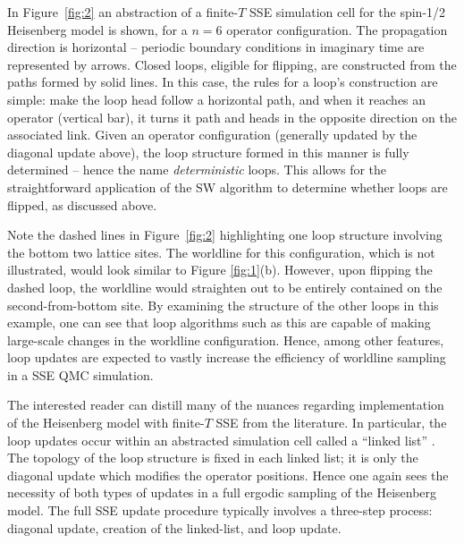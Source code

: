 \documentclass[vecphys]{svmult}
\begin{document}
In Figure~\ref{fig:2} an abstraction of a finite-$T$ SSE simulation cell for the spin-1/2 Heisenberg model is shown, for a $n=6$ operator configuration.  The propagation direction is horizontal -- periodic boundary conditions in imaginary time are represented by arrows.  Closed loops, eligible for flipping, are constructed from the  paths formed by solid lines.  In this case, the rules for a loop's construction are simple: make the loop head follow a horizontal path, and when it reaches an operator (vertical bar), it turns it path and heads in the opposite direction on the associated link.  Given an operator configuration (generally updated by the diagonal update above), the loop structure formed in this manner is fully determined -- hence the name {\it deterministic} loops.  
This allows for the straightforward application of the SW algorithm to determine whether loops are flipped, as discussed above.

Note the dashed lines in Figure~\ref{fig:2} highlighting one loop structure involving the bottom two lattice sites.  The worldline for this configuration, which is not illustrated, would look similar to Figure \ref{fig:1}(b).  However, upon flipping the dashed loop, the worldline would straighten out to be entirely contained on the second-from-bottom site.  By examining the structure of the other loops in this example, one can see that loop algorithms such as this are capable of making large-scale changes in the worldline configuration.  Hence, among other features, loop updates are expected to vastly increase the efficiency of worldline sampling in a SSE QMC simulation.

The interested reader can distill many of the nuances regarding implementation of the Heisenberg model with finite-$T$ SSE from the literature.    In particular, the loop updates occur within an abstracted simulation cell called a ``linked list'' \cite{Melko:Syljuasen02}.  The topology of the loop structure is fixed in each linked list; it is only the diagonal update which modifies the operator positions.  Hence one again sees the necessity of both types of updates in a full ergodic sampling of the Heisenberg model.  The full SSE update procedure typically involves a three-step process: diagonal update, creation of the linked-list, and loop update.  
\end{document}
